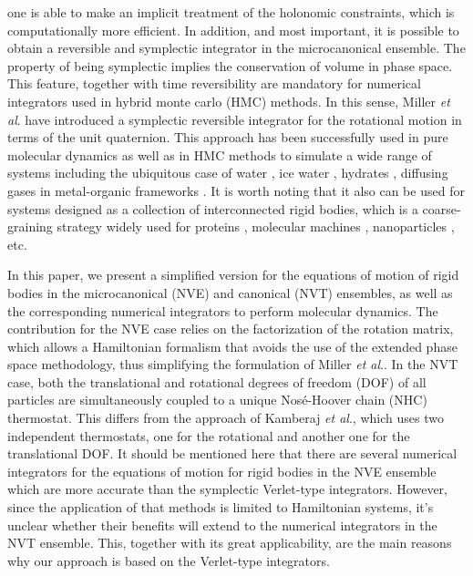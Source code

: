 \documentclass[aip,jcp,reprint,amsmath,amssymb]{revtex4-1}
\begin{document}
one is able to make an implicit treatment of the holonomic constraints, which is computationally more efficient. In addition, and most important, it is possible to obtain a reversible and symplectic integrator in the microcanonical ensemble. The property of being symplectic implies the conservation of volume in phase space. This feature, together with time reversibility are mandatory for numerical integrators used in hybrid monte carlo (HMC) methods.\cite{Duane1987} In this sense, Miller \textit{et al}.\cite{Miller2002} have introduced a symplectic reversible integrator for the rotational motion in terms of the unit quaternion. This approach has been successfully used in pure molecular dynamics as well as in HMC methods to simulate a wide range of systems including the ubiquitous case of water \cite{Sakamaki2011,Reinhardt2012,Palmer2014,Gonzales2014}, ice water \cite{Geiger2014}, hydrates \cite{Tribello2009,Gorman2012}, diffusing gases in metal-organic frameworks \citep{Ghoufi2010}. It is worth noting that it also can be used for systems designed as a collection of interconnected rigid bodies, which is a coarse-graining strategy widely used for proteins \citep{Terada2003}, molecular machines \citep{Akimov2008,Konyukhov2010}, nanoparticles \cite{Knorowski2012,Patra2013}, etc.
 
In this paper, we present a simplified version for the equations of motion of rigid bodies in the microcanonical (NVE) and canonical (NVT) ensembles, as well as the corresponding numerical integrators to perform molecular dynamics. The contribution for the NVE case relies on the factorization of the rotation matrix, which allows a Hamiltonian formalism that avoids the use of the extended phase space methodology, thus simplifying the formulation of Miller \textit{et al}.\cite{Miller2002}. In the NVT case, both the translational and rotational degrees of freedom (DOF) of all particles are simultaneously coupled to a unique Nos\'{e}-Hoover chain (NHC) thermostat. This differs from the approach of Kamberaj \textit{et al}.\cite{Kamberaj2005}, which uses two independent thermostats, one for the rotational and another one for the translational DOF. It should be mentioned here that there are several numerical integrators\cite{Omelyan2007,Omelyan2008,vanZon2008} for the equations of motion for rigid bodies in the NVE ensemble which are more accurate than the symplectic Verlet-type integrators. However, since the application of that methods is limited to Hamiltonian systems, it's unclear whether their benefits will extend to the numerical integrators in the NVT ensemble. This, together with its great applicability, are the main reasons why our approach is based on the Verlet-type integrators.
\end{document}
